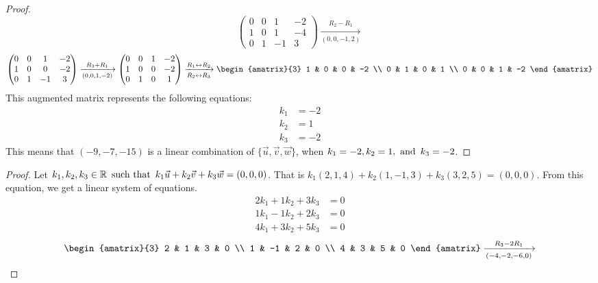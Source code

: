 \begin{enumerate}
\begin{proof}
\[\begin{pmatrix}
        0 & 0 & 1  & -2 \\
        1 & 0 & 1  & -4 \\
        0 & 1 & -1 & 3
      \end{pmatrix} \xrightarrow[(0,0,-1,2)]{R_2 - R_1}
    \]
    \[
      \begin{pmatrix}
        0 & 0 & 1  & -2 \\
        1 & 0 & 0  & -2 \\
        0 & 1 & -1 & 3
      \end{pmatrix} \xrightarrow[(0,0,1,-2)]{R_3 + R_1}
      \begin{pmatrix}
        0 & 0 & 1 & -2 \\
        1 & 0 & 0 & -2 \\
        0 & 1 & 0 & 1
      \end{pmatrix} \xrightarrow[R_2 \leftrightarrow R_3]{R_1 \leftrightarrow R_2}
      \begin{amatrix}{3}
        1 & 0 & 0 & -2 \\
        0 & 1 & 0 & 1 \\
        0 & 0 & 1 & -2
      \end{amatrix}
    \]
    This augmented matrix represents the following equations:
    \begin{align*}
      k_1 & = -2 \\
      k_2 & = 1  \\
      k_3 & = -2
    \end{align*}
    This means that $(-9,-7,-15)$ is a linear combination of $\{\vec{u},\vec{v},\vec{w}\}$, when $k_1 = -2, k_2 = 1, \operatorname{~\text{and}~} k_3 = -2$.
  \end{proof}
  \begin{proof}
    Let $k_1,k_2,k_3 \in \mathbb{R} \operatorname{~\text{such that}~} k_1\vec{u} + k_2\vec{v} + k_3\vec{w} = (0,0,0)$. That is $k_1(2,1,4) + k_2(1,-1,3) + k_3(3,2,5) = (0,0,0)$. From this equation, we get a linear system of equations.
    \begin{align*}
      2k_1 + 1k_2 + 3k_3 & = 0 \\
      1k_1 - 1k_2 + 2k_3 & = 0 \\
      4k_1 + 3k_2 + 5k_3 & = 0
    \end{align*}
    \[
      \begin{amatrix}{3}
        2 & 1 & 3 & 0 \\
        1 & -1 & 2 & 0 \\
        4 & 3 & 5 & 0
      \end{amatrix} \xrightarrow[(-4,-2,-6,0)]{R_3 - 2R_1}
\]
\end{proof}
\end{enumerate}
